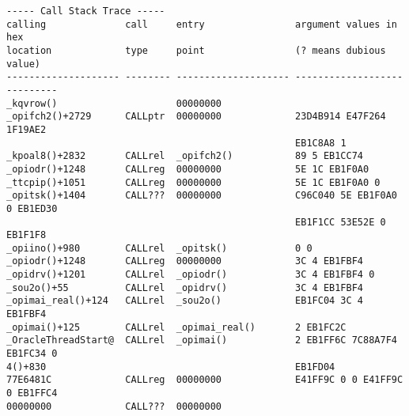 \myindex{\oracle}
\label{Oracle_SYM_files_example}


\begin{lstlisting}
----- Call Stack Trace -----
calling              call     entry                argument values in hex      
location             type     point                (? means dubious value)     
-------------------- -------- -------------------- ----------------------------
_kqvrow()                     00000000             
_opifch2()+2729      CALLptr  00000000             23D4B914 E47F264 1F19AE2
                                                   EB1C8A8 1
_kpoal8()+2832       CALLrel  _opifch2()           89 5 EB1CC74
_opiodr()+1248       CALLreg  00000000             5E 1C EB1F0A0
_ttcpip()+1051       CALLreg  00000000             5E 1C EB1F0A0 0
_opitsk()+1404       CALL???  00000000             C96C040 5E EB1F0A0 0 EB1ED30
                                                   EB1F1CC 53E52E 0 EB1F1F8
_opiino()+980        CALLrel  _opitsk()            0 0
_opiodr()+1248       CALLreg  00000000             3C 4 EB1FBF4
_opidrv()+1201       CALLrel  _opiodr()            3C 4 EB1FBF4 0
_sou2o()+55          CALLrel  _opidrv()            3C 4 EB1FBF4
_opimai_real()+124   CALLrel  _sou2o()             EB1FC04 3C 4 EB1FBF4
_opimai()+125        CALLrel  _opimai_real()       2 EB1FC2C
_OracleThreadStart@  CALLrel  _opimai()            2 EB1FF6C 7C88A7F4 EB1FC34 0
4()+830                                            EB1FD04
77E6481C             CALLreg  00000000             E41FF9C 0 0 E41FF9C 0 EB1FFC4
00000000             CALL???  00000000             
\end{lstlisting}



